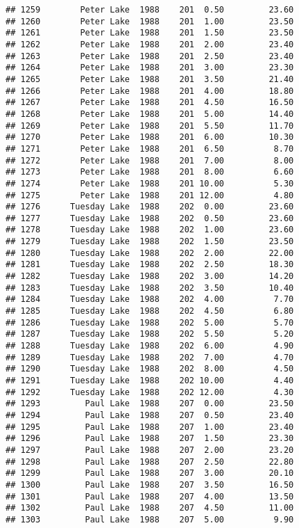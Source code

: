 \documentclass[
]{article}
\begin{document}
\begin{verbatim}
## 1259        Peter Lake  1988    201  0.50         23.60
## 1260        Peter Lake  1988    201  1.00         23.50
## 1261        Peter Lake  1988    201  1.50         23.50
## 1262        Peter Lake  1988    201  2.00         23.40
## 1263        Peter Lake  1988    201  2.50         23.40
## 1264        Peter Lake  1988    201  3.00         23.30
## 1265        Peter Lake  1988    201  3.50         21.40
## 1266        Peter Lake  1988    201  4.00         18.80
## 1267        Peter Lake  1988    201  4.50         16.50
## 1268        Peter Lake  1988    201  5.00         14.40
## 1269        Peter Lake  1988    201  5.50         11.70
## 1270        Peter Lake  1988    201  6.00         10.30
## 1271        Peter Lake  1988    201  6.50          8.70
## 1272        Peter Lake  1988    201  7.00          8.00
## 1273        Peter Lake  1988    201  8.00          6.60
## 1274        Peter Lake  1988    201 10.00          5.30
## 1275        Peter Lake  1988    201 12.00          4.80
## 1276      Tuesday Lake  1988    202  0.00         23.60
## 1277      Tuesday Lake  1988    202  0.50         23.60
## 1278      Tuesday Lake  1988    202  1.00         23.60
## 1279      Tuesday Lake  1988    202  1.50         23.50
## 1280      Tuesday Lake  1988    202  2.00         22.00
## 1281      Tuesday Lake  1988    202  2.50         18.30
## 1282      Tuesday Lake  1988    202  3.00         14.20
## 1283      Tuesday Lake  1988    202  3.50         10.40
## 1284      Tuesday Lake  1988    202  4.00          7.70
## 1285      Tuesday Lake  1988    202  4.50          6.80
## 1286      Tuesday Lake  1988    202  5.00          5.70
## 1287      Tuesday Lake  1988    202  5.50          5.20
## 1288      Tuesday Lake  1988    202  6.00          4.90
## 1289      Tuesday Lake  1988    202  7.00          4.70
## 1290      Tuesday Lake  1988    202  8.00          4.50
## 1291      Tuesday Lake  1988    202 10.00          4.40
## 1292      Tuesday Lake  1988    202 12.00          4.30
## 1293         Paul Lake  1988    207  0.00         23.50
## 1294         Paul Lake  1988    207  0.50         23.40
## 1295         Paul Lake  1988    207  1.00         23.40
## 1296         Paul Lake  1988    207  1.50         23.30
## 1297         Paul Lake  1988    207  2.00         23.20
## 1298         Paul Lake  1988    207  2.50         22.80
## 1299         Paul Lake  1988    207  3.00         20.10
## 1300         Paul Lake  1988    207  3.50         16.50
## 1301         Paul Lake  1988    207  4.00         13.50
## 1302         Paul Lake  1988    207  4.50         11.00
## 1303         Paul Lake  1988    207  5.00          9.90

\end{verbatim}
\end{document}
